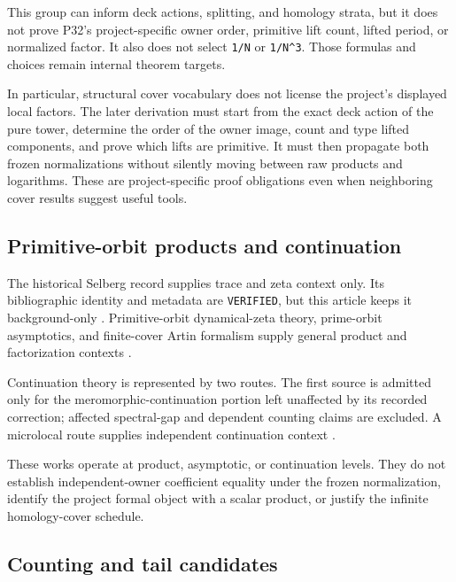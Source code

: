 \documentclass[11pt]{article}
\begin{document}
This group can inform deck actions, splitting, and homology strata, but
it does not prove P32's project-specific owner order, primitive lift
count, lifted period, or normalized factor. It also does not select
\texttt{1/N} or \texttt{1/N\^{}3}. Those formulas and choices remain
internal theorem targets.

In particular, structural cover vocabulary does not license the
project's displayed local factors. The later derivation must start from
the exact deck action of the pure tower, determine the order of the
owner image, count and type lifted components, and prove which lifts are
primitive. It must then propagate both frozen normalizations without
silently moving between raw products and logarithms. These are
project-specific proof obligations even when neighboring cover results
suggest useful tools.

\hypertarget{23-primitive-orbit-products-and-continuation}{%
\subsection{Primitive-orbit products and
continuation}\label{23-primitive-orbit-products-and-continuation}}

The historical Selberg record supplies trace and zeta context only. Its
bibliographic identity and metadata are \texttt{VERIFIED}, but this
article keeps it background-only
\citep{P32-S13}.
Primitive-orbit dynamical-zeta theory, prime-orbit asymptotics, and
finite-cover Artin formalism supply general product and factorization
contexts
\citep{P32-S14,P32-S15,P32-S16}.

Continuation theory is represented by two routes. The first source is
admitted only for the meromorphic-continuation portion left unaffected
by its recorded correction; affected spectral-gap and dependent counting
claims are excluded. A microlocal route supplies independent
continuation context
\citep{P32-S17,P32-S18}.

These works operate at product, asymptotic, or continuation levels. They
do not establish independent-owner coefficient equality under the frozen
normalization, identify the project formal object with a scalar product,
or justify the infinite homology-cover schedule.

\hypertarget{24-counting-and-tail-candidates}{%
\subsection{Counting and tail
candidates}\label{24-counting-and-tail-candidates}}
\end{document}
